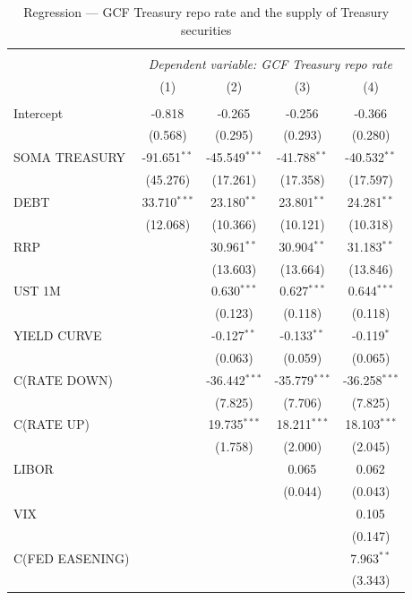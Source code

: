 \documentclass[11pt,a4paper,english,oneside]{article}
\begin{document}
\begin{table}[!htbp] \centering
\caption{Regression --- GCF Treasury repo rate and the supply of Treasury securities}
\begin{tabular}{@{\extracolsep{5pt}}lcccc}
\\[-1.8ex]\hline
\hline \\[-1.8ex]
& \multicolumn{4}{c}{\textit{Dependent variable: GCF Treasury repo rate}} \
\cr \cline{4-5}
\\[-1.8ex] & (1) & (2) & (3) & (4) \\
\hline \\[-1.8ex]
 Intercept & -0.818$^{}$ & -0.265$^{}$ & -0.256$^{}$ & -0.366$^{}$ \\
  & (0.568) & (0.295) & (0.293) & (0.280) \\
 SOMA TREASURY & -91.651$^{**}$ & -45.549$^{***}$ & -41.788$^{**}$ & -40.532$^{**}$ \\
  & (45.276) & (17.261) & (17.358) & (17.597) \\
 DEBT & 33.710$^{***}$ & 23.180$^{**}$ & 23.801$^{**}$ & 24.281$^{**}$ \\
  & (12.068) & (10.366) & (10.121) & (10.318) \\
 RRP & & 30.961$^{**}$ & 30.904$^{**}$ & 31.183$^{**}$ \\
  & & (13.603) & (13.664) & (13.846) \\
 UST 1M & & 0.630$^{***}$ & 0.627$^{***}$ & 0.644$^{***}$ \\
  & & (0.123) & (0.118) & (0.118) \\
 YIELD CURVE & & -0.127$^{**}$ & -0.133$^{**}$ & -0.119$^{*}$ \\
  & & (0.063) & (0.059) & (0.065) \\
 C(RATE DOWN) & & -36.442$^{***}$ & -35.779$^{***}$ & -36.258$^{***}$ \\
  & & (7.825) & (7.706) & (7.825) \\
 C(RATE UP) & & 19.735$^{***}$ & 18.211$^{***}$ & 18.103$^{***}$ \\
  & & (1.758) & (2.000) & (2.045) \\
 LIBOR & & & 0.065$^{}$ & 0.062$^{}$ \\
  & & & (0.044) & (0.043) \\
 VIX & & & & 0.105$^{}$ \\
  & & & & (0.147) \\
 C(FED EASENING) & & & & 7.963$^{**}$ \\
  & & & & (3.343) \\

\end{tabular}
\end{table}
\end{document}
